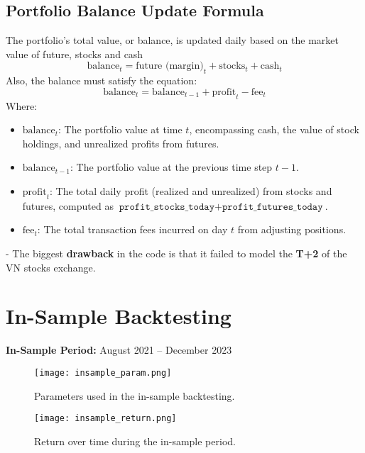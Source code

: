 \documentclass[a4paper,12pt]{article}
\begin{document}
\subsection{Portfolio Balance Update Formula}
The portfolio’s total value, or balance, is updated daily based on the market value of future, stocks and cash
\begin{equation}
\text{balance}_t = \text{future (margin)}_{t} + \text{stocks}_t + \text{cash}_t
\end{equation}
Also, the balance must satisfy the equation:
\begin{equation}
\text{balance}_t = \text{balance}_{t-1} + \text{profit}_t - \text{fee}_t
\end{equation}
Where:
\begin{itemize}
    \item \(\text{balance}_t\): The portfolio value at time \(t\), encompassing cash, the value of stock holdings, and unrealized profits from futures.
    \item \(\text{balance}_{t-1}\): The portfolio value at the previous time step \(t-1\).
    \item \(\text{profit}_t\): The total daily profit (realized and unrealized) from stocks and futures, computed as \(\texttt{profit\_stocks\_today} + \texttt{profit\_futures\_today}\).
    \item \(\text{fee}_t\): The total transaction fees incurred on day \(t\) from adjusting positions.
\end{itemize}


- The biggest \textbf{drawback} in the code is that it failed to model the \textbf{T+2} of the VN stocks exchange.

\section{In-Sample Backtesting}
\textbf{In-Sample Period:} August 2021 -- December 2023

\begin{figure}[h!]
    \centering
    \texttt{[image: insample\_param.png]}
    \caption{Parameters used in the in-sample backtesting.}
    \label{fig:parameters}
\end{figure}


\begin{figure}[h!]
    \centering
    \texttt{[image: insample\_return.png]}
    \caption{Return over time during the in-sample period.}
    \label{fig:return_over_time}
\end{figure}
\end{document}
